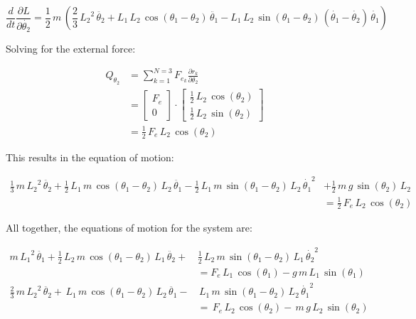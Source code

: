\documentclass[12pt, letterpaper]{../assignment}
\begin{document}
$$ \frac{d}{d t} \frac{\partial L}{\partial \dot{\theta_2}} =
\frac{1}{2}\,m\,{\left(\frac{2}{3}\,{L_2 }^2 \,\ddot{\theta_2} +L_1 \,L_2 \,\cos \left(\theta_1 -\theta_2 \right)\,\ddot{\theta_1} -L_1 \,L_2 \,\sin \left(\theta_1 -\theta_2 \right)\,{\left(\dot{\theta_1} -\dot{\theta_2} \right)}\,\dot{\theta_1} \right)} $$

Solving for the external force:

\begin{equation*}
    \begin{aligned}
    Q_{\theta_2} &= \sum_{k=1}^{N=3} F_{e_k} \frac{\partial r_k }{\partial {\theta_2}}\\
    &=\left[\begin{array}{c} F_{e}\\ 0 \end{array}\right] \cdot \left[\begin{array}{c} \frac{1}{2}\,L_{2}\,\cos\left(\theta _{2}\right)\\ \frac{1}{2}\,L_{2}\,\sin\left(\theta _{2}\right) \end{array}\right]\\
    &= \frac{1}{2}\,F_e \,L_2 \,\cos \left(\theta_2\right)
    \end{aligned}
\end{equation*}

This results in the equation of motion:

\begin{equation*}
    \begin{aligned}
    \frac{1}{3}\,m\,{L_2 }^2 \,\ddot{\theta_2} +\frac{1}{2}\,L_1 \,m\,\cos \left(\theta_1 -\theta_2 \right)\,L_2 \,\ddot{\theta_1} -\frac{1}{2}\,L_1 \,m\,\sin \left(\theta_1 -\theta_2 \right)\,L_2 \,{{\dot{\theta_1}}}^2 &+\frac{1}{2}\,m\,g\,\sin \left(\theta_2 \right)\,L_2 \\
    &= \frac{1}{2}\,F_e \,L_2 \,\cos \left(\theta_2\right)
    \end{aligned}
\end{equation*}

All together, the equations of motion for the system are:

\begin{answer}
    \begin{equation*}
        \begin{aligned}
m\,{L_1 }^2 \,\ddot{\theta_1} +\frac{1}{2}\,L_2 \,m\,\cos \left(\theta_1 -\theta_2 \right)\,L_1 \,\ddot{\theta_2} +&\frac{1}{2}\,L_2 \,m\,\sin \left(\theta_1 -\theta_2 \right)\,L_1 \,{{\dot{\theta_2}}}^2 \\
\ &= F_e \,L_1 \,\cos \left(\theta_1\right) - g\,m\,L_1 \,\sin \left(\theta_1 \right)\\
\frac{2}{3}\,m\,{L_2 }^2 \,\ddot{\theta_2} +\,L_1 \,m\,\cos \left(\theta_1 -\theta_2 \right)\,L_2 \,\ddot{\theta_1} -&\,L_1 \,m\,\sin \left(\theta_1 -\theta_2 \right)\,L_2 \,{{\dot{\theta_1}}}^2 \\
&= \,F_e \,L_2 \,\cos \left(\theta_2\right)-\,m\,g\,L_2 \,\sin \left(\theta_2 \right)
        \end{aligned}
    \end{equation*}
\end{answer}
\end{document}
